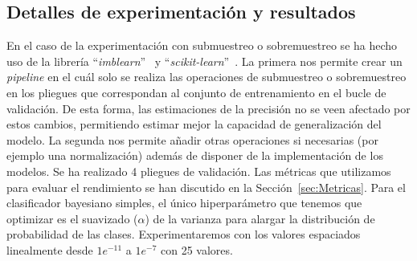 \documentclass[12pt,letterpaper]{article}
\begin{document}
\subsection{Detalles de experimentación y resultados}\label{sec:ExpBayes}
En el caso de la experimentación con submuestreo o sobremuestreo se ha hecho uso de la librería ``\textit{imblearn}''~\cite{imblearn} y ``\textit{scikit-learn}''~\cite{sklearn}. 
La primera nos permite crear un \textit{pipeline} en el cuál solo se realiza las operaciones de submuestreo o sobremuestreo en los pliegues que correspondan al conjunto de entrenamiento en el bucle de validación. 
De esta forma, las estimaciones de la precisión no se veen afectado por estos cambios, permitiendo estimar mejor la capacidad de generalización del modelo. La segunda nos permite añadir otras operaciones si necesarias (por ejemplo una normalización) además de disponer de la implementación de los modelos.
Se ha realizado 4 pliegues de validación. Las métricas que utilizamos para evaluar el rendimiento se han discutido en la Sección~\ref{sec:Metricas}.
Para el clasificador bayesiano simples, el único hiperparámetro que tenemos que optimizar es el suavizado ($\alpha$) de la varianza para alargar la distribución de probabilidad de las clases.
Experimentaremos con los valores espaciados linealmente desde $1e^{-11 }$ a $1e^{-7}$ con 25 valores.
\end{document}
